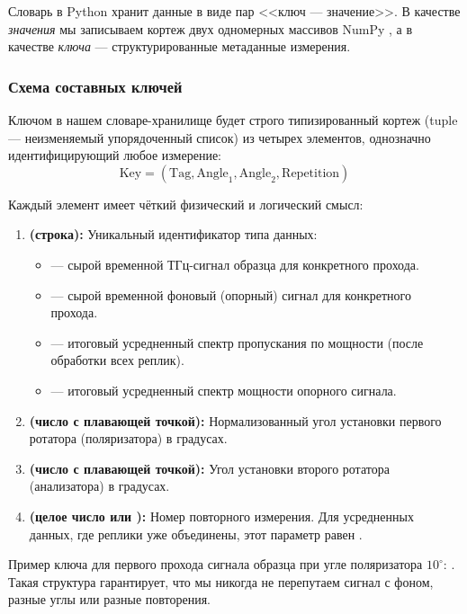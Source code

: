 Словарь в Python хранит данные в виде пар <<ключ --- значение>>. В качестве \textit{значения} мы записываем кортеж двух одномерных массивов NumPy , а в качестве \textit{ключа} --- структурированные метаданные измерения.

\subsubsection{Схема составных ключей}

Ключом в нашем словаре-хранилище  будет строго типизированный кортеж (tuple --- неизменяемый упорядоченный список) из четырех элементов, однозначно идентифицирующий любое измерение:
\begin{equation}
\text{Key} = (\text{Tag}, \text{Angle}_1, \text{Angle}_2, \text{Repetition})
\end{equation}

Каждый элемент имеет чёткий физический и логический смысл:
\begin{enumerate}
    \item \textbf{ (строка):} Уникальный идентификатор типа данных:
    \begin{itemize}
        \item {} --- сырой временной ТГц-сигнал образца для конкретного прохода.
        \item {} --- сырой временной фоновый (опорный) сигнал для конкретного прохода.
        \item {} --- итоговый усредненный спектр пропускания по мощности (после обработки всех реплик).
        \item {} --- итоговый усредненный спектр мощности опорного сигнала.
    \end{itemize}
    \item \textbf{ (число с плавающей точкой):} Нормализованный угол установки первого ротатора (поляризатора) в градусах.
    \item \textbf{ (число с плавающей точкой):} Угол установки второго ротатора (анализатора) в градусах.
    \item \textbf{ (целое число или ):} Номер повторного измерения. Для усредненных данных, где реплики уже объединены, этот параметр равен .
\end{enumerate}

Пример ключа для первого прохода сигнала образца при угле поляризатора $10^\circ$: . Такая структура гарантирует, что мы никогда не перепутаем сигнал с фоном, разные углы или разные повторения.

